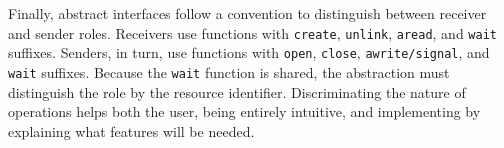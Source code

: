 			Finally, abstract interfaces follow a convention to distinguish
			between receiver and sender roles. Receivers use functions with
			\texttt{create}, \texttt{unlink}, \texttt{aread}, and \texttt{wait}
			suffixes. Senders, in turn, use functions with \texttt{open},
			\texttt{close}, \texttt{awrite/signal}, and \texttt{wait} suffixes.
			Because the \texttt{wait} function is shared, the abstraction must
			distinguish the role by the resource identifier. Discriminating the
			nature of operations helps both the user, being entirely intuitive,
			and implementing \hal by explaining what features will be needed.





